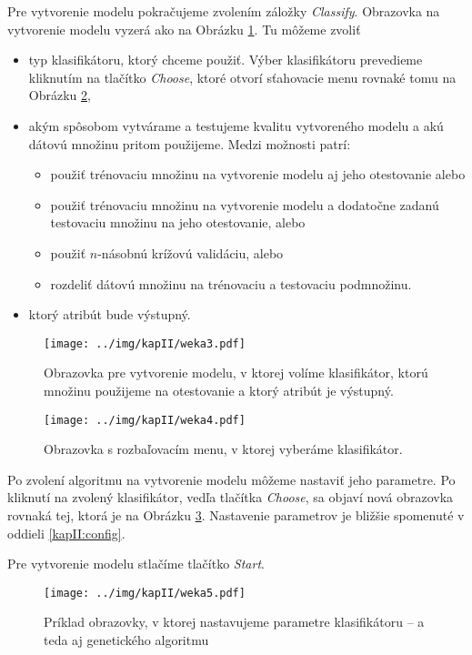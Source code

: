 Pre vytvorenie modelu pokračujeme zvolením záložky \emph{Classify}. Obrazovka na vytvorenie modelu vyzerá ako na Obrázku \ref{fig:gui3}. Tu môžeme zvoliť 
\begin{itemize}
\item typ klasifikátoru, ktorý chceme použiť. Výber klasifikátoru prevedieme kliknutím na tlačítko \emph{Choose}, ktoré otvorí sťahovacie menu rovnaké tomu na Obrázku \ref{fig:gui4},
\item akým spôsobom vytvárame a testujeme kvalitu vytvoreného modelu a akú dátovú množinu pritom použijeme. Medzi možnosti patrí:
\begin{itemize}
\item použiť trénovaciu množinu na vytvorenie modelu aj jeho otestovanie alebo
\item použiť trénovaciu množinu na vytvorenie modelu a dodatočne zadanú testovaciu množinu na jeho otestovanie, alebo
\item použiť $n$-násobnú krížovú validáciu, alebo
\item rozdeliť dátovú množinu na trénovaciu a testovaciu podmnožinu.
\end{itemize}
\item ktorý atribút bude výstupný.
\end{itemize}  

\begin{figure}[h!]
\centering
\centerline{\mbox{\texttt{[image: ../img/kapII/weka3.pdf]}}}
\caption{Obrazovka pre vytvorenie modelu, v ktorej volíme klasifikátor, ktorú množinu použijeme na otestovanie a ktorý atribút je výstupný.}\label{fig:gui3}
\end{figure}

\begin{figure}[h!]
\centering
\centerline{\mbox{\texttt{[image: ../img/kapII/weka4.pdf]}}}
\caption{Obrazovka s rozbaľovacím menu, v ktorej vyberáme klasifikátor.}\label{fig:gui4}
\end{figure}

Po zvolení algoritmu na vytvorenie modelu môžeme nastaviť jeho parametre. Po kliknutí na zvolený klasifikátor, vedľa tlačítka \emph{Choose}, sa objaví nová obrazovka rovnaká tej, ktorá je na Obrázku \ref{fig:gui5}. Nastavenie parametrov je bližšie spomenuté v oddieli \ref{kapII:config}.

Pre vytvorenie modelu stlačíme tlačítko \emph{Start}.

\begin{figure}[h!]
\centering
\centerline{\mbox{\texttt{[image: ../img/kapII/weka5.pdf]}}}
\caption{Príklad obrazovky, v ktorej nastavujeme parametre klasifikátoru -- a teda aj genetického algoritmu}\label{fig:gui5}
\end{figure}

